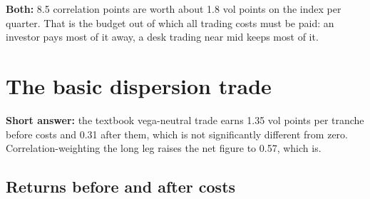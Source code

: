 \begin{desk}
\textbf{Both:} 8.5 correlation points are worth about 1.8 vol points on the index per quarter. That is the budget out of which all trading costs must be paid: an investor pays most of it away, a desk trading near mid keeps most of it.
\end{desk}

\section{The basic dispersion trade}\label{sec:basic}

\textbf{Short answer:} the textbook vega-neutral trade earns 1.35 vol points per tranche before costs and 0.31 after them, which is not significantly different from zero. Correlation-weighting the long leg raises the net figure to 0.57, which is.

\subsection{Returns before and after costs}

